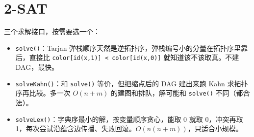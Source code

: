 \section{2-SAT}
三个求解接口，按需要选一个：

\begin{itemize}
\tightlist
\item
  \texttt{solve()}：Tarjan 弹栈顺序天然是逆拓扑序，弹栈编号小的分量在拓扑序里靠后，直接比 \texttt{color{[}id(x,1){]}\ \textless{}\ color{[}id(x,0){]}} 就知道该不该取真。不建 DAG，最快。
\item
  \texttt{solveKahn()}：和 \texttt{solve()} 等价，但把缩点后的 DAG 建出来跑 Kahn 求拓扑序再比较。多一次 \(O(n+m)\) 的建图和排队，解可能和 \texttt{solve()} 不同（都合法）。
\item
  \texttt{solveLex()}：字典序最小的解，按变量顺序贪心，能取 0 就取 0，冲突再取 1，每次尝试沿蕴含边传播、失败回滚。\(O(n(n+m))\)，只适合小规模。
\end{itemize}


